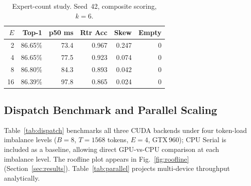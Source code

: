 \begin{table}[H]
\caption{Expert-count study. Seed~42, composite scoring, $k{=}6$.}
\label{tab:expert_count}
\centering
\small
\begin{tabular}{rrrrrr}
\toprule
$E$ & \textbf{Top-1} & \textbf{p50 ms} & \textbf{Rtr Acc} & \textbf{Skew} & \textbf{Empty} \\
\midrule
 2 & 86.65\% & 73.4 & 0.967 & 0.247 & 0 \\
 4 & 86.65\% & 77.5 & 0.923 & 0.074 & 0 \\
 8 & 86.80\% & 84.3 & 0.893 & 0.042 & 0 \\
16 & 86.39\% & 97.8 & 0.865 & 0.024 & 0 \\
\bottomrule
\end{tabular}
\end{table}

\begin{table}[H]
\caption{Router architecture comparison. Seed~42, $E{=}4$, composite scoring. Entropy: aggregate expert-usage entropy (distribution of tokens across experts, per layer; max $=\ln 4 \approx 1.386$). Note: this is the \emph{load-balance} entropy, distinct from the per-token predictive entropy in Fig.~\ref{fig:expert_entropy} ($\approx$0.40 nats), which measures router confidence.}
\label{tab:router_comparison}
\centering
\small
{}
\end{table}

\FloatBarrier
\subsection{Dispatch Benchmark and Parallel Scaling}
\label{app:dispatch}

Table~\ref{tab:dispatch} benchmarks all three CUDA backends under four token-load imbalance levels ($B{=}8$, $T{=}1568$ tokens, $E{=}4$, GTX\,960); CPU Serial is included as a baseline, allowing direct GPU-vs-CPU comparison at each imbalance level. The roofline plot appears in Fig.~\ref{fig:roofline} (Section~\ref{sec:results}). Table~\ref{tab:parallel} projects multi-device throughput analytically.

